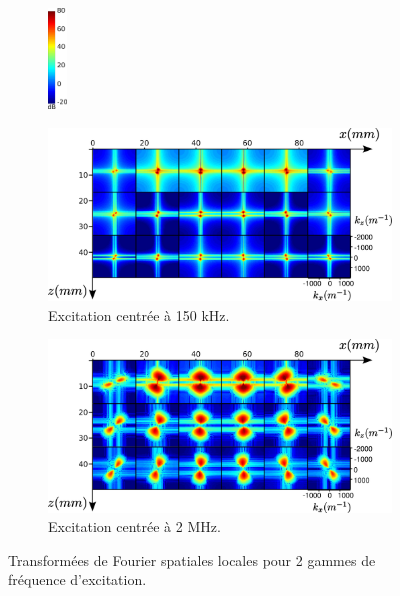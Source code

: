 \begin{figure}[!h]
    \centering
    \begin{subfigure}[b]{0.05\textwidth}
 		\hspace{-2cm}\includegraphics[width=0.5cm]{img/echelle_fft.png}\vspace{2.1cm}
	\end{subfigure}
    \begin{subfigure}[b]{0.4\textwidth}
		\hspace{-3cm}\includegraphics[width=1.5\textwidth]{img/ssfreesurf_150k}
		\caption{Excitation centrée à 150 kHz.}
		\label{app:150k}
	\end{subfigure}	
	\begin{subfigure}[b]{0.4\textwidth}
		\includegraphics[width=1.5\textwidth]{img/ssfreesurf_2M}
		\caption{Excitation centrée à 2 MHz.}
		\label{app:2M}
	\end{subfigure}
	\caption{Transformées de Fourier spatiales locales pour 2 gammes de fréquence d'excitation.}
\end{figure}

